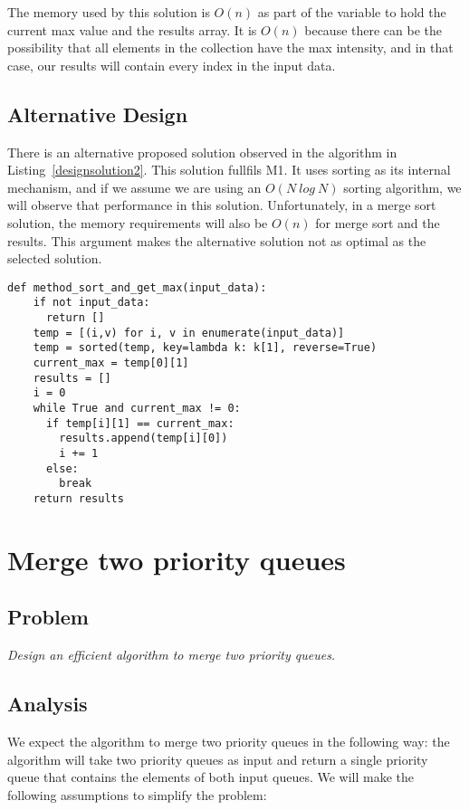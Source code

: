\documentclass{article}
\begin{document}
The memory used by this solution is $O(n)$ as part of the variable to hold the current max value and the results array. It is $O(n)$ because there can be the possibility that all elements in the collection have the max intensity, and in that case, our results will contain every index in the input data.

\subsection{Alternative Design}

There is an alternative proposed solution observed in the algorithm in Listing~\ref{designsolution2}. This solution fullfils M1. It uses sorting as its internal mechanism, and if we assume we are using an $O(N~log~N)$ sorting algorithm, we will observe that performance in this solution. Unfortunately, in a merge sort solution, the memory requirements will also be $O(n)$ for merge sort and the results. This argument makes the alternative solution not as optimal as the selected solution.

\begin{lstlisting}[style=mypython,caption={Alternative solution to retrieve max intensities},label=designsolution2,captionpos=b]
  def method_sort_and_get_max(input_data):
    if not input_data:
      return []
    temp = [(i,v) for i, v in enumerate(input_data)]
    temp = sorted(temp, key=lambda k: k[1], reverse=True)
    current_max = temp[0][1]
    results = []
    i = 0
    while True and current_max != 0:
      if temp[i][1] == current_max:
        results.append(temp[i][0])
        i += 1
      else:
        break
    return results
\end{lstlisting}

\section{Merge two priority queues}

\subsection{Problem}

\textit{Design an efficient algorithm to merge two priority queues.}

\subsection{Analysis}

We expect the algorithm to merge two priority queues in the following way: the algorithm will take two priority queues as input and return a single priority queue that contains the elements of both input queues. We will make the following assumptions to simplify the problem:
\end{document}
